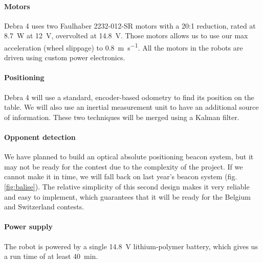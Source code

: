 \documentclass[a4paper]{paper}
\begin{document}
\paragraph{Motors}
Debra 4 uses two Faulhaber 2232-012-SR motors with a 20:1 reduction, rated at \SI{8.7}{\watt} at \SI{12}{\volt}, overvolted at \SI{14.8}{\volt}.
Those motors allows us to use our max acceleration (wheel slippage) to \SI{0.8}{\meter\per\second}.
All the motors in the robots are driven using custom power electronics.

\paragraph{Positioning}
Debra 4 will use a standard, encoder-based odometry to find its position on the table.
We will also use an inertial measurement unit to have an additional source of information.
These two techniques will be merged using a Kalman filter.

\paragraph{Opponent detection}
We have planned to build an optical absolute positioning beacon system, but it may not be ready for the contest due to the complexity of the project.
If we cannot make it in time, we will fall back on last year's beacon system (fig. \ref{fig:balise}).
The relative simplicity of this second design makes it very reliable and easy to implement, which guarantees that it will be ready for the Belgium and Switzerland contests.

\paragraph{Power supply}
The robot is powered by a single \SI{14.8}{\volt} lithium-polymer battery, which gives us a run time of at least \SI{40}{\minute}.
\end{document}
